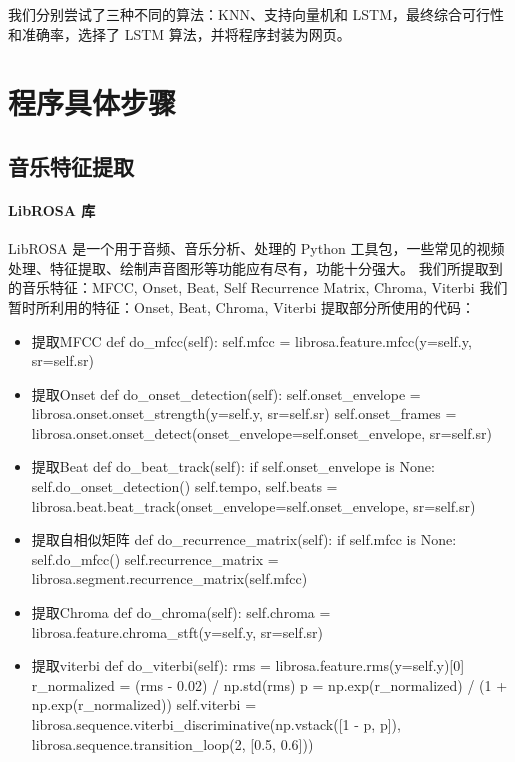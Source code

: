 \documentclass[a4paper,utf8,10pt]{article}
\begin{document}
我们分别尝试了三种不同的算法：KNN、支持向量机和 LSTM，最终综合可行性和准确率，选择了 LSTM 算法，并将程序封装为网页。

\section{程序具体步骤}
\subsection{音乐特征提取}
\paragraph{LibROSA 库} LibROSA 是一个用于音频、音乐分析、处理的 Python 工具包，一些常见的视频处理、特征提取、绘制声音图形等功能应有尽有，功能十分强大。
我们所提取到的音乐特征：MFCC, Onset, Beat, Self Recurrence Matrix, Chroma, Viterbi
我们暂时所利用的特征：Onset, Beat, Chroma, Viterbi
提取部分所使用的代码：
\noindent\begin{itemize}
\item 提取MFCC
    def do_mfcc(self):   
        self.mfcc = librosa.feature.mfcc(y=self.y, sr=self.sr)
    
\item 提取Onset
    def do_onset_detection(self):  
        self.onset_envelope = librosa.onset.onset_strength(y=self.y, sr=self.sr)
        self.onset_frames = librosa.onset.onset_detect(onset_envelope=self.onset_envelope, sr=self.sr)
        
\item 提取Beat
    def do_beat_track(self):  
        if self.onset_envelope is None:
            self.do_onset_detection()
        self.tempo, self.beats = librosa.beat.beat_track(onset_envelope=self.onset_envelope, sr=self.sr)
        
\item 提取自相似矩阵
    def do_recurrence_matrix(self):   
        if self.mfcc is None:
            self.do_mfcc()
        self.recurrence_matrix = librosa.segment.recurrence_matrix(self.mfcc)

\item 提取Chroma
    def do_chroma(self):
        self.chroma = librosa.feature.chroma_stft(y=self.y, sr=self.sr)

\item 提取viterbi
    def do_viterbi(self):
        rms = librosa.feature.rms(y=self.y)[0]
        r_normalized = (rms - 0.02) / np.std(rms)
        p = np.exp(r_normalized) / (1 + np.exp(r_normalized))
        self.viterbi = librosa.sequence.viterbi_discriminative(np.vstack([1 - p, p]), librosa.sequence.transition_loop(2, [0.5, 0.6]))
\end{itemize}
\end{document}
